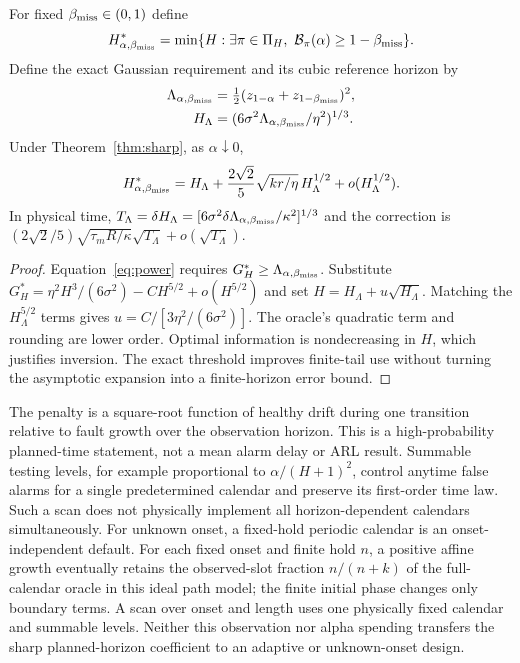 \begin{corollary}\label{cor:delay}
For fixed $\beta_{\rm miss}\in(0,1)$ define
\begin{equation}
 H_{\alpha,\beta_{\rm miss}}^*=
 \min\{H:\exists\pi\in\Pi_H,\ \mathcal B_\pi(\alpha)\ge1-\beta_{\rm miss}\}.
\end{equation}
Define the exact Gaussian requirement and its cubic reference horizon by
\begin{align}
 \Lambda_{\alpha,\beta_{\rm miss}}&=\tfrac12
 (z_{1-\alpha}+z_{1-\beta_{\rm miss}})^2,\nonumber\\
 H_\Lambda&=(6\sigma^2\Lambda_{\alpha,\beta_{\rm miss}}/\eta^2)^{1/3}.
\end{align}
Under Theorem~\ref{thm:sharp}, as $\alpha\downarrow0$,
\begin{equation}
 H_{\alpha,\beta_{\rm miss}}^*
 =H_\Lambda+\frac{2\sqrt2}{5}\sqrt{kr/\eta}\,H_\Lambda^{1/2}
 +o(H_\Lambda^{1/2}).\label{eq:delay}
\end{equation}
In physical time, $T_\Lambda=\delta H_\Lambda=[6\sigma^2\delta\Lambda_{\alpha,\beta_{\rm miss}}/\kappa^2]^{1/3}$ and the correction is
$(2\sqrt2/5)\sqrt{\tau_mR/\kappa}\sqrt{T_\Lambda}+o(\sqrt{T_\Lambda})$.
\end{corollary}
\begin{proof}
Equation~\eqref{eq:power} requires $G_H^*\ge\Lambda_{\alpha,\beta_{\rm miss}}$. Substitute $G_H^*=\eta^2H^3/(6\sigma^2)-C H^{5/2}+o(H^{5/2})$ and set $H=H_\Lambda+u\sqrt{H_\Lambda}$. Matching the $H_\Lambda^{5/2}$ terms gives $u=C/[3\eta^2/(6\sigma^2)]$. The oracle's quadratic term and rounding are lower order. Optimal information is nondecreasing in $H$, which justifies inversion. The exact threshold improves finite-tail use without turning the asymptotic expansion into a finite-horizon error bound.\end{proof}
The penalty is a square-root function of healthy drift during one transition relative to fault growth over the observation horizon. This is a high-probability planned-time statement, not a mean alarm delay or ARL result. Summable testing levels, for example proportional to $\alpha/(H+1)^2$, control anytime false alarms for a single predetermined calendar and preserve its first-order time law. Such a scan does not physically implement all horizon-dependent calendars simultaneously.
For unknown onset, a fixed-hold periodic calendar is an onset-independent default. For each fixed onset and finite hold $n$, a positive affine growth eventually retains the observed-slot fraction $n/(n+k)$ of the full-calendar oracle in this ideal path model; the finite initial phase changes only boundary terms. A scan over onset and length uses one physically fixed calendar and summable levels. Neither this observation nor alpha spending transfers the sharp planned-horizon coefficient to an adaptive or unknown-onset design.

